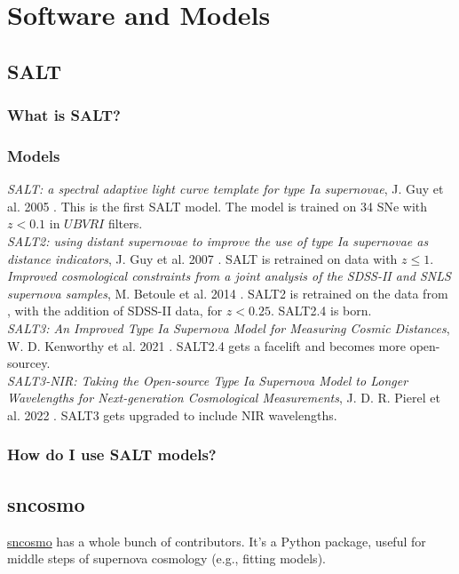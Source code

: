 \section{Software and Models}
\label{sec:software}
\subsection{SALT}
\subsubsection{What is SALT?}


\subsubsection{Models}
\textit{SALT: a spectral adaptive light curve template for type Ia supernovae}, J. Guy et al. 2005 \cite{salt}. This is the first SALT model. The model is trained on 34 SNe with $z < 0.1$ in $UBVRI$ filters. \\

\textit{SALT2: using distant supernovae to improve the use of type Ia supernovae as distance indicators}, J. Guy et al. 2007 \cite{salt2}. SALT is retrained on data with $z \leq 1$. \\

\textit{Improved cosmological constraints from a joint analysis of the SDSS-II and SNLS supernova samples}, M. Betoule et al. 2014 \cite{salt2.4}. SALT2 is retrained on the data from \cite{salt2}, with the addition of SDSS-II data, for $z < 0.25$. SALT2.4 is born. \\

\textit{SALT3: An Improved Type Ia Supernova Model for Measuring Cosmic Distances}, W. D. Kenworthy et al. 2021 \cite{salt3}. SALT2.4 gets a facelift and becomes more open-sourcey. \\

\textit{SALT3-NIR: Taking the Open-source Type Ia Supernova Model to Longer Wavelengths for Next-generation Cosmological Measurements}, J. D. R. Pierel et al. 2022 \cite{salt3nir}. SALT3 gets upgraded to include NIR wavelengths. 

\subsubsection{How do I use SALT models?}

\subsection{sncosmo}
\href{https://github.com/sncosmo/sncosmo}{sncosmo} has a whole bunch of contributors. It's a Python package, useful for middle steps of supernova cosmology (e.g., fitting models). 

